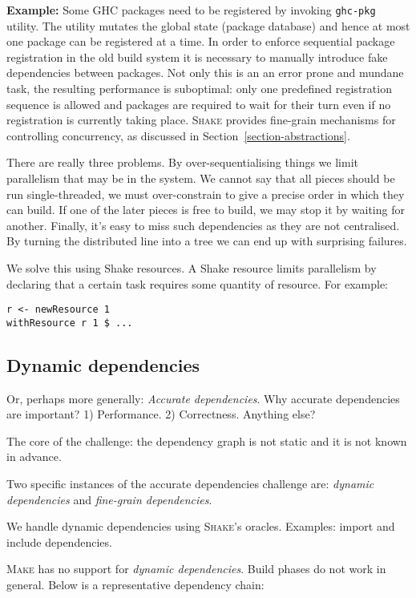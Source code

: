 \textbf{Example:} Some GHC packages need to be registered by invoking
\texttt{ghc-pkg} utility. The utility mutates the global state (package
database) and hence at most one package can be registered at a time. In order to
enforce sequential package registration in the old build system it is necessary
to manually introduce fake dependencies between packages. Not only this is an
an error prone and mundane task, the resulting performance is suboptimal: only
one predefined registration sequence is allowed and packages are required to
wait for their turn even if no registration is currently taking place.
\textsc{Shake} provides fine-grain mechanisms for controlling concurrency, as
discussed in Section~\ref{section-abstractions}.

There are really three problems. By over-sequentialising things we limit parallelism that may be in the system. We cannot say that all pieces should be run single-threaded, we must over-constrain to give a precise order in which they can build. If one of the later pieces is free to build, we may stop it by waiting for another. Finally, it's easy to miss such dependencies as they are not centralised. By turning the distributed line into a tree we can end up with surprising failures.

We solve this using Shake resources. A Shake resource limits parallelism by declaring that a certain task requires some quantity of resource. For example:

\begin{verbatim}
r <- newResource 1
withResource r 1 $ ...
\end{verbatim}

\subsection{Dynamic dependencies}

Or, perhaps more generally: \emph{Accurate dependencies}. Why accurate
dependencies are important? 1) Performance. 2) Correctness. Anything else?

The core of the challenge: the dependency graph is not static and it is not
known in advance.

Two specific instances of the accurate dependencies challenge are: \emph{dynamic
dependencies} and \emph{fine-grain dependencies}.

We handle dynamic dependencies using \textsc{Shake}'s oracles. Examples: import
and include dependencies.

\textsc{Make} has no support for \emph{dynamic dependencies}. Build
phases do not work in general. Below is a representative dependency chain:



